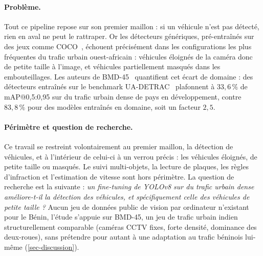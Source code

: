 \paragraph{Problème.}
Tout ce pipeline repose sur son premier maillon : si un véhicule n'est
pas détecté, rien en aval ne peut le rattraper. Or les détecteurs
génériques, pré-entraînés sur des jeux comme COCO~\cite{lin2014coco},
échouent précisément dans les configurations les plus fréquentes du
trafic urbain ouest-africain : véhicules éloignés de la caméra donc de
petite taille à l'image, et véhicules partiellement masqués dans les
embouteillages. Les auteurs de BMD-45~\cite{sharma2026bmd45} quantifient
cet écart de domaine : des détecteurs entraînés sur le benchmark
UA-DETRAC~\cite{wen2020uadetrac} plafonnent à $33{,}6\,\%$ de
mAP@0,5:0,95 sur du trafic urbain dense de pays en développement, contre
$83{,}8\,\%$ pour des modèles entraînés en domaine, soit un facteur
$2{,}5$.

\paragraph{Périmètre et question de recherche.}
Ce travail se restreint volontairement au premier maillon, la détection
de véhicules, et à l'intérieur de celui-ci à un verrou précis : les
véhicules éloignés, de petite taille ou masqués. Le suivi multi-objets,
la lecture de plaques, les règles d'infraction et l'estimation de
vitesse sont hors périmètre. La question de recherche est la suivante :
\emph{un fine-tuning de YOLOv8 sur du trafic urbain dense améliore-t-il
la détection des véhicules, et spécifiquement celle des véhicules de
petite taille ?} Aucun jeu de données public de vision par ordinateur
n'existant pour le Bénin, l'étude s'appuie sur BMD-45, un jeu de trafic
urbain indien structurellement comparable (caméras CCTV fixes, forte
densité, dominance des deux-roues), sans prétendre pour autant à une
adaptation au trafic béninois lui-même (\cref{sec-discussion}).

